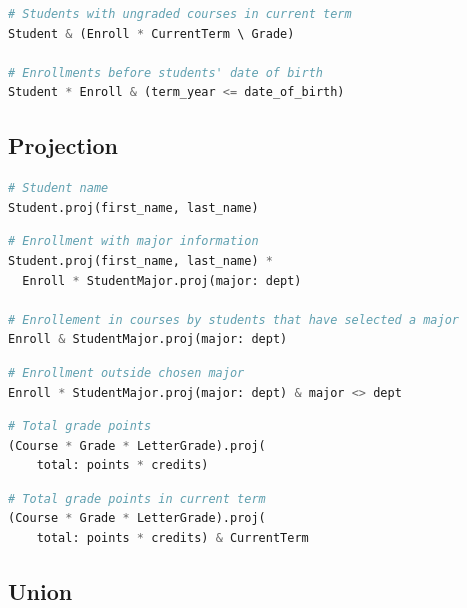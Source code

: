\documentclass[letter,10pt]{article}
\begin{document}
\begin{lstlisting}[language=Python, caption={Join in expressions.}, label={lst:join2}]
# Students with ungraded courses in current term
Student & (Enroll * CurrentTerm \ Grade)

# Enrollments before students' date of birth
Student * Enroll & (term_year <= date_of_birth)
\end{lstlisting}

\subsection{Projection}\label{sec:proj}
\begin{lstlisting}[language=Python, caption={Selecting  attributes.}, label={lst:select}]
# Student name
Student.proj(first_name, last_name)
\end{lstlisting}

\begin{lstlisting}[language=Python, caption={Renaming attributes.}, label={lst:rename}]
# Enrollment with major information
Student.proj(first_name, last_name) * 
  Enroll * StudentMajor.proj(major: dept)

# Enrollement in courses by students that have selected a major
Enroll & StudentMajor.proj(major: dept)
\end{lstlisting}

\begin{lstlisting}[language=Python, caption={Projection in composite expressions.}, label={lst:proj}]
# Enrollment outside chosen major
Enroll * StudentMajor.proj(major: dept) & major <> dept
\end{lstlisting}

\begin{lstlisting}[language=Python, caption={Extension: calculated attributes.}, label={lst:extend}]
# Total grade points
(Course * Grade * LetterGrade).proj(
    total: points * credits)
\end{lstlisting}

\begin{lstlisting}[language=Python, caption={}]
# Total grade points in current term
(Course * Grade * LetterGrade).proj(
    total: points * credits) & CurrentTerm
\end{lstlisting}

\subsection{Union}\label{sec:union}
\end{document}
